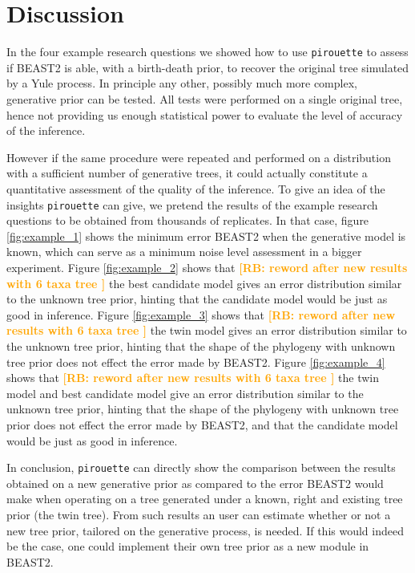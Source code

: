 \documentclass{article}
\newcommand{\richel}[1]{\textcolor{orange}{\textbf{[RB: #1]}}}
\begin{document}
\section{Discussion}

In the four example research questions we showed how to use \verb;pirouette; 
to assess if BEAST2 is able, with a birth-death prior, 
to recover the original tree simulated by a Yule process. 
In principle any other, possibly much more complex, 
generative prior can be tested.
All tests were performed on a single original tree, 
hence not providing us enough statistical power to 
evaluate the level of accuracy of the inference. 

However if the same procedure were repeated and performed on a distribution 
with a sufficient number of generative trees, 
it could actually constitute a quantitative assessment 
of the quality of the inference.
To give an idea of the insights \verb;pirouette; can give,
we pretend the results of the example research questions
to be obtained from thousands of replicates.
In that case, figure \ref{fig:example_1} shows 
the minimum error BEAST2 when the
generative model is known, which can serve as 
a minimum noise level assessment in a bigger experiment.  
Figure \ref{fig:example_2} shows that 
\richel{
  reword after new results with 6 taxa tree
} 
the best candidate model gives an error distribution similar to the unknown tree prior,
hinting that the candidate model would be just as good in inference.
Figure \ref{fig:example_3} shows that 
\richel{
  reword after new results with 6 taxa tree
} 
the twin model gives an error distribution similar to the unknown tree prior,
hinting that the shape of the phylogeny with unknown tree prior
does not effect the error made by BEAST2.
Figure \ref{fig:example_4} shows that 
\richel{
  reword after new results with 6 taxa tree
} 
the twin model and best candidate model give 
an error distribution similar to the unknown tree prior,
hinting that the shape of the phylogeny with unknown tree prior
does not effect the error made by BEAST2, 
and that the candidate model would be just as good in inference.

In conclusion, \verb;pirouette; can directly show 
the comparison between the results obtained 
on a new generative prior as compared to the error BEAST2 
would make when operating on a tree generated 
under a known, right and existing tree prior (the twin tree).
From such results an user can estimate whether or not a new tree prior, 
tailored on the generative process, is needed. 
If this would indeed be the case, 
one could implement their own tree prior as a new module in BEAST2.
\end{document}
